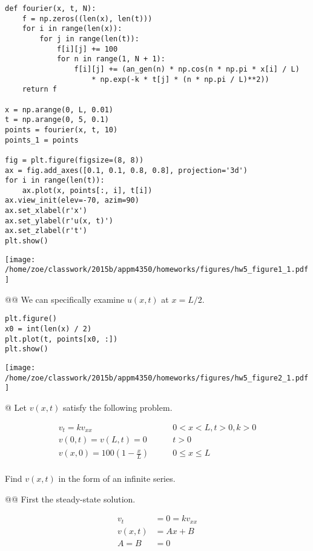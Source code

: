 \documentclass[10pt]{article}
\begin{document}
\begin{easylist}[enumerate]
\begin{verbatim}
def fourier(x, t, N):
    f = np.zeros((len(x), len(t)))
    for i in range(len(x)):
        for j in range(len(t)):
            f[i][j] += 100
            for n in range(1, N + 1):
                f[i][j] += (an_gen(n) * np.cos(n * np.pi * x[i] / L)
                    * np.exp(-k * t[j] * (n * np.pi / L)**2))
    return f

x = np.arange(0, L, 0.01)
t = np.arange(0, 5, 0.1)
points = fourier(x, t, 10)
points_1 = points

fig = plt.figure(figsize=(8, 8))
ax = fig.add_axes([0.1, 0.1, 0.8, 0.8], projection='3d')
for i in range(len(t)):
    ax.plot(x, points[:, i], t[i])
ax.view_init(elev=-70, azim=90)
ax.set_xlabel(r'x')
ax.set_ylabel(r'u(x, t)')
ax.set_zlabel(r't')
plt.show()
\end{verbatim}
\texttt{[image: /home/zoe/classwork/2015b/appm4350/homeworks/figures/hw5\_figure1\_1.pdf]}

\noweave

    @@ We can specifically examine $u(x, t)$ at $x = L / 2$.

\weave

\begin{verbatim}
plt.figure()
x0 = int(len(x) / 2)
plt.plot(t, points[x0, :])
plt.show()
\end{verbatim}
\texttt{[image: /home/zoe/classwork/2015b/appm4350/homeworks/figures/hw5\_figure2\_1.pdf]}

\noweave

    \newpage
    @ Let $v(x, t)$ satisfy the following problem.

    \begin{align*}
        v_t = kv_{xx} \qquad & 0 < x < L, t > 0, k > 0\\
        v(0, t) = v(L, t) = 0 \qquad & t > 0\\
        v(x, 0) = 100 \left( 1 - \frac{x}{L} \right) \qquad & 0 \le x \le L\\
    \end{align*}

    Find $v(x, t)$ in the form of an infinite series.

    @@ First the steady-state solution.

    \begin{align*}
        v_t &= 0 = kv_{xx}\\
        v(x, t) &= Ax + B\\
        A = B &= 0\\
    \end{align*}


\end{easylist}
\end{document}
